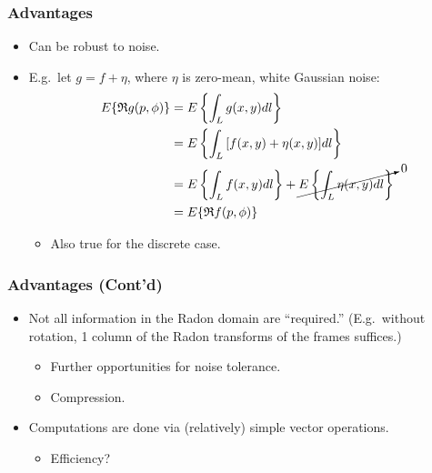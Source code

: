 \documentclass[12pt,x11names]{beamer}
\begin{document}
\begin{frame}
  \frametitle{Advantages}
  
  \begin{itemize}

  \item Can be robust to noise.

  \item E.g.\ let $g = f + \eta$, where $\eta$ is zero-mean, white Gaussian
    noise:
    \begin{align*}
      E\{ \mathfrak{R}g(p,\phi) \}
      &= E\left\{ \int_L{g(x,y) dl} \right\} \\
      &= E\left\{ \int_L{[f(x,y) + \eta(x,y)] dl} \right\} \\
      &= E\left\{ \int_L{f(x,y) dl} \right\}
      + \cancelto{0}{E\left\{ \int_L{\eta(x,y) dl} \right\}} \\
      &= E\{ \mathfrak{R}f(p,\phi) \}
    \end{align*}
    \begin{itemize}
    \item Also true for the discrete case.
    \end{itemize}
  \end{itemize}

\end{frame}


\begin{frame}
  \frametitle{Advantages (Cont'd)}
  
  \begin{itemize}

  \item Not all information in the Radon domain are ``required.'' (E.g.\
    without rotation, 1 column of the Radon transforms of the frames
    suffices.)
    \begin{itemize}
    \item Further opportunities for noise tolerance.
    \item Compression.
    \end{itemize}

  \item Computations are done via (relatively) simple vector operations.
    \begin{itemize}
    \item Efficiency?
    \end{itemize}

  \end{itemize}
\end{frame}
\end{document}
